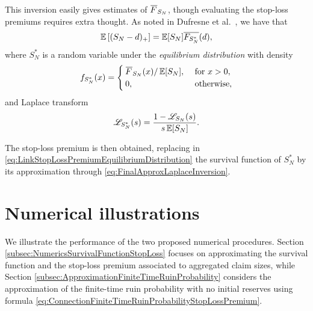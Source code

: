 This inversion easily gives estimates of $\Ftail_{S_N}$, though evaluating the stop-loss premiums requires extra thought.
As noted in Dufresne et al.\ \cite{DuGaMo09}, we have that
\begin{equation}\label{eq:LinkStopLossPremiumEquilibriumDistribution}
\operatorname{{\mathbb E}}\left[(S_N-d)_{+}\right]=\operatorname{{\mathbb E}}[S_N]\overline{F_{S_N^{\ast}}}(d),
\end{equation}
where $S_N^{\ast}$ is a random variable under the \emph{equilibrium distribution} with density
\begin{equation*}
f_{S_N^{\ast}}(x)=\begin{cases}
\Ftail_{S_N}(x) / \Exp[S_N],&\text{ for }x>0,\\
0,&\text{ otherwise},
\end{cases}
\end{equation*}
and Laplace transform
\begin{equation*}\label{eq:LaplaceTransformEquilibriumDistribution}
\mathscr{L}_{S_N^{\ast}}(s)=\frac{1-\mathscr{L}_{S_N}(s)}{s\operatorname{{\mathbb E}}[S_N]}.
\end{equation*}

The stop-loss premium is then obtained, replacing in \eqref{eq:LinkStopLossPremiumEquilibriumDistribution} the survival function of $S_N^{\ast}$ by its approximation through \eqref{eq:FinalApproxLaplaceInversion}.
%

\section{Numerical illustrations}\label{sec:NumericalIllustrations}

We illustrate the performance of the two proposed numerical procedures. Section \ref{subsec:NumericsSurvivalFunctionStopLoss} focuses on approximating the survival function and the stop-loss premium associated to aggregated claim sizes, while Section \ref{subsec:ApproximationFiniteTimeRuinProbability} considers the approximation of the finite-time ruin probability with no initial reserves using formula \eqref{eq:ConnectionFiniteTimeRuinProbabilityStopLossPremium}.

